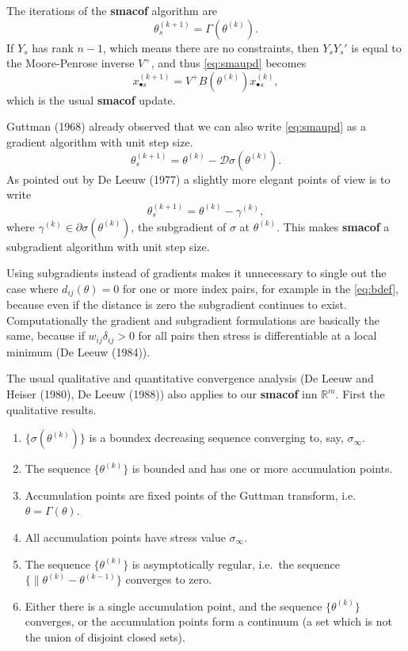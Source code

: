 \documentclass[
  12pt,
]{article}
\providecommand{\tightlist}{%
  \setlength{\itemsep}{0pt}\setlength{\parskip}{0pt}}
\begin{document}
The iterations of the \textbf{smacof} algorithm are
\begin{equation}
\theta^{(k+1)}_s=\Gamma(\theta^{(k)}).
\label{eq:smaupd}
\end{equation}
If \(Y_s\) has rank \(n-1\), which means there are no constraints, then \(Y_sY_s'\) is equal to the Moore-Penrose inverse \(V^+\), and thus \eqref{eq:smaupd} becomes
\begin{equation}
x_{\bullet s}^{(k+1)}=V^+B(\theta^{(k)})x_{\bullet s}^{(k)},
\label{eq:smaxupd}
\end{equation}
which is the usual \textbf{smacof} update.

Guttman (1968) already observed that we can also write \eqref{eq:smaupd} as a gradient algorithm with unit step size.
\begin{equation}
\theta^{(k+1)}_s=\theta^{(k)}-\mathcal{D}\sigma(\theta^{(k)}).
\label{eq:smaupdg}
\end{equation}
As pointed out by De Leeuw (1977) a slightly more elegant points of view is to write
\begin{equation}
\theta^{(k+1)}_s=\theta^{(k)}-\gamma^{(k)},
\label{eq:smaupdgsg}
\end{equation}
where \(\gamma^{(k)}\in\partial\sigma(\theta^{(k)})\), the subgradient of \(\sigma\) at
\(\theta^{(k)}\). This makes \textbf{smacof} a subgradient algorithm with unit step size.

Using subgradients instead of gradients makes it unnecessary to single out the
case where \(d_{ij}(\theta)=0\) for one or more index pairs, for example in the \eqref{eq:bdef},
because even if the distance is zero the subgradient continues to exist. Computationally the gradient and subgradient formulations are basically the same, because if \(w_{ij}\delta_{ij}>0\) for all pairs
then stress is differentiable at a local minimum (De Leeuw (1984)).

The usual qualitative and quantitative convergence analysis (De Leeuw and Heiser (1980), De Leeuw (1988)) also applies to our \textbf{smacof} inn \(\mathbb{R}^m\). First the qualitative results.

\begin{enumerate}
\def\labelenumi{\arabic{enumi}.}
\tightlist
\item
  \(\{\sigma(\theta^{(k)})\}\) is a boundex decreasing sequence converging to, say, \(\sigma_\infty\).
\item
  The sequence \(\{\theta^{(k)}\}\) is bounded and has one or more accumulation points.
\item
  Accumulation points are fixed points of the Guttman transform, i.e.~\(\theta=\Gamma(\theta)\).
\item
  All accumulation points have stress value \(\sigma_\infty\).
\item
  The sequence \(\{\theta^{(k)}\}\) is asymptotically regular, i.e.~the sequence \(\{\|\theta^{(k)}-\theta^{(k-1)}\}\) converges to zero.
\item
  Either there is a single accumulation point, and the sequence \(\{\theta^{(k)}\}\) converges, or the accumulation points form a continuum (a set which is not the union of disjoint closed sets).
\end{enumerate}
\end{document}
